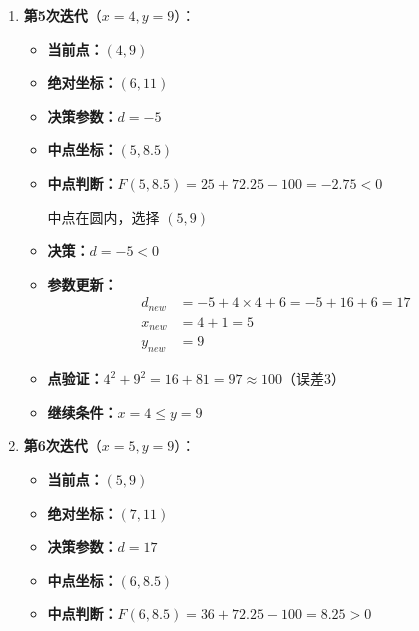 ﻿\documentclass[12pt,a4paper]{article}
\begin{document}
\begin{enumerate}
\begin{itemize}
    中点在圆外，选择 $P_2 = (4, 9)$（右下移动）
  \item \textbf{决策：}$d = 13 \geq 0$，使用增量公式 $d_{new} = d + 4(x-y) + 10$
  \item \textbf{参数更新：}
    \begin{align*}
    d_{new} &= 13 + 4 \times (3-10) + 10 \\
    &= 13 + 4 \times (-7) + 10 \\
    &= 13 - 28 + 10 = -5 \\
    y_{new} &= 10 - 1 = 9 \\
    x_{new} &= 3 + 1 = 4
    \end{align*}
  \item \textbf{点验证：}$3^2 + 10^2 = 109 \neq 100$（误差较大，但下一个点会更接近）
  \item \textbf{继续条件：}$x = 3 \leq y = 10$ \checkmark
  \end{itemize}

\item \textbf{第5次迭代}（$x=4, y=9$）：
  \begin{itemize}
  \item \textbf{当前点：}$(4, 9)$
  \item \textbf{绝对坐标：}$(6, 11)$
  \item \textbf{决策参数：}$d = -5$
  \item \textbf{中点坐标：}$(5, 8.5)$
  \item \textbf{中点判断：}$F(5, 8.5) = 25 + 72.25 - 100 = -2.75 < 0$
    
    中点在圆内，选择 $(5, 9)$
  \item \textbf{决策：}$d = -5 < 0$
  \item \textbf{参数更新：}
    \begin{align*}
    d_{new} &= -5 + 4 \times 4 + 6 = -5 + 16 + 6 = 17 \\
    x_{new} &= 4 + 1 = 5 \\
    y_{new} &= 9
    \end{align*}
  \item \textbf{点验证：}$4^2 + 9^2 = 16 + 81 = 97 \approx 100$（误差3）
  \item \textbf{继续条件：}$x = 4 \leq y = 9$ \checkmark
  \end{itemize}

\item \textbf{第6次迭代}（$x=5, y=9$）：
  \begin{itemize}
  \item \textbf{当前点：}$(5, 9)$
  \item \textbf{绝对坐标：}$(7, 11)$
  \item \textbf{决策参数：}$d = 17$
  \item \textbf{中点坐标：}$(6, 8.5)$
  \item \textbf{中点判断：}$F(6, 8.5) = 36 + 72.25 - 100 = 8.25 > 0$
    

\end{itemize}
\end{enumerate}
\end{document}
